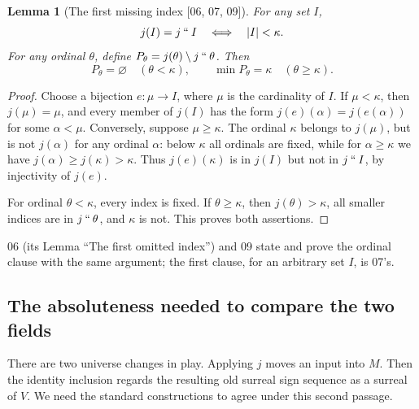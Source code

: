 \documentclass[11pt,letterpaper]{article}
\numberwithin{equation}{section}
\newtheorem{lemma}[theorem]{Lemma}
\theoremstyle{definition}
\theoremstyle{remark}
\newcommand{\imset}[2]{#1\mathbin{``}#2}
\newcommand{\abs}[1]{\lvert#1\rvert}
\newcommand{\src}[1]{\textup{\textsf{\small[#1]}}}%
\begin{document}
\begin{lemma}[The first missing index \src{06, 07, 09}]\label{lce:lem:index}
For any set $I$,
\[
 j(I)=\imset jI\quad\Longleftrightarrow\quad\abs I<\kappa.
\]
For any ordinal $\theta$, define
$P_\theta=j(\theta)\setminus\imset j\theta$. Then
\[
 P_\theta=\varnothing\quad(\theta<\kappa),\qquad
 \min P_\theta=\kappa\quad(\theta\ge\kappa).
\]
\end{lemma}
\begin{proof}
Choose a bijection $e:\mu\to I$, where $\mu$ is the cardinality of $I$.
If $\mu<\kappa$, then $j(\mu)=\mu$, and every member of $j(I)$ has the
form $j(e)(\alpha)=j(e(\alpha))$ for some $\alpha<\mu$.
Conversely, suppose $\mu\ge\kappa$. The ordinal $\kappa$ belongs to
$j(\mu)$, but is not $j(\alpha)$ for any ordinal $\alpha$: below $\kappa$
all ordinals are fixed, while for $\alpha\ge\kappa$ we have
$j(\alpha)\ge j(\kappa)>\kappa$. Thus $j(e)(\kappa)$ is in $j(I)$ but
not in $\imset jI$, by injectivity of $j(e)$.

For ordinal $\theta<\kappa$, every index is fixed. If $\theta\ge\kappa$,
then $j(\theta)>\kappa$, all smaller indices are in $\imset j\theta$, and
$\kappa$ is not. This proves both assertions.
\end{proof}
06 (its Lemma ``The first omitted index'') and 09 state and prove the
ordinal clause with the same argument; the first clause, for an arbitrary
set $I$, is 07's.

\subsection{The absoluteness needed to compare the two fields}
There are two universe changes in play. Applying $j$ moves an input into
$M$. Then the identity inclusion regards the resulting old surreal sign
sequence as a surreal of $V$. We need the standard constructions to agree
under this second passage.
\end{document}
